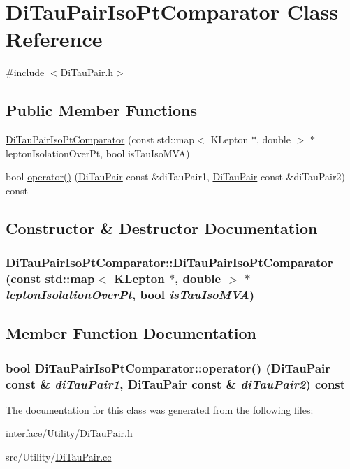 \hypertarget{classDiTauPairIsoPtComparator}{
\section{DiTauPairIsoPtComparator Class Reference}
\label{classDiTauPairIsoPtComparator}
}


{\ttfamily \#include $<$DiTauPair.h$>$}\subsection*{Public Member Functions}
\begin{DoxyCompactItemize}
\item 
\hyperlink{classDiTauPairIsoPtComparator_a60e0bc2c6ebb5b3ed6bebbe730c0c00e}{DiTauPairIsoPtComparator} (const std::map$<$ KLepton $\ast$, double $>$ $\ast$leptonIsolationOverPt, bool isTauIsoMVA)
\item 
bool \hyperlink{classDiTauPairIsoPtComparator_affcb196eafbbfe828318724ac43fad3f}{operator()} (\hyperlink{classDiTauPair}{DiTauPair} const \&diTauPair1, \hyperlink{classDiTauPair}{DiTauPair} const \&diTauPair2) const 
\end{DoxyCompactItemize}


\subsection{Constructor \& Destructor Documentation}
\hypertarget{classDiTauPairIsoPtComparator_a60e0bc2c6ebb5b3ed6bebbe730c0c00e}{
\subsubsection[{DiTauPairIsoPtComparator}]{\setlength{\rightskip}{0pt plus 5cm}DiTauPairIsoPtComparator::DiTauPairIsoPtComparator (const std::map$<$ KLepton $\ast$, double $>$ $\ast$ {\em leptonIsolationOverPt}, \/  bool {\em isTauIsoMVA})}}
\label{classDiTauPairIsoPtComparator_a60e0bc2c6ebb5b3ed6bebbe730c0c00e}


\subsection{Member Function Documentation}
\hypertarget{classDiTauPairIsoPtComparator_affcb196eafbbfe828318724ac43fad3f}{
\subsubsection[{operator()}]{\setlength{\rightskip}{0pt plus 5cm}bool DiTauPairIsoPtComparator::operator() ({\bf DiTauPair} const \& {\em diTauPair1}, \/  {\bf DiTauPair} const \& {\em diTauPair2}) const}}
\label{classDiTauPairIsoPtComparator_affcb196eafbbfe828318724ac43fad3f}


The documentation for this class was generated from the following files:\begin{DoxyCompactItemize}
\item 
interface/Utility/\hyperlink{DiTauPair_8h}{DiTauPair.h}\item 
src/Utility/\hyperlink{DiTauPair_8cc}{DiTauPair.cc}\end{DoxyCompactItemize}
